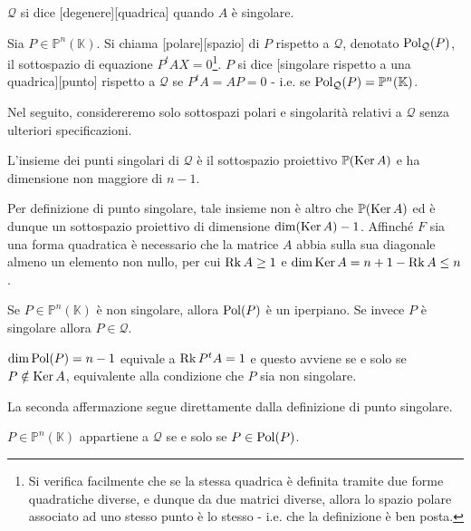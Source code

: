 \begin{Definition}\label{def50}
	$\mathcal{Q}$ si dice [degenere][quadrica] quando $A$ \`e singolare.
\end{Definition}
\begin{Definition}\label{def51}
	Sia $P \in \mathbb{P}^n(\mathbb{K})$. Si chiama [polare][spazio] di $P$ rispetto a $\mathcal{Q}$, denotato $\operatorname{Pol}_\mathcal{Q}(P)$, il sottospazio di equazione $P^tAX = 0$\footnote{Si verifica facilmente che se la stessa quadrica \`e definita tramite due forme quadratiche diverse, e dunque da due matrici diverse, allora lo spazio polare associato ad uno stesso punto \`e lo stesso - i.e. che la definizione \`e ben posta.}. $P$ si dice [singolare rispetto a una quadrica][punto] rispetto a $\mathcal{Q}$ se $P^tA = AP = 0$ - i.e. se $\operatorname{Pol}_\mathcal{Q}(P) = \mathbb{P}^n(\mathbb{K})$.
\end{Definition}
	\par Nel seguito, considereremo solo sottospazi polari e singolarit\`a relativi a $\mathcal{Q}$ senza ulteriori specificazioni.
\begin{Theorem}\label{th56bis}
	L'insieme dei punti singolari di $\mathcal{Q}$ \`e il sottospazio proiettivo $\mathbb{P}(\operatorname{Ker} A)$ e ha dimensione non maggiore di $n - 1$.
\end{Theorem}
\Proof Per definizione di punto singolare, tale insieme non \`e altro che $\mathbb{P}(\operatorname{Ker} A)$ ed \`e dunque un sottospazio proiettivo di dimensione $\dim (\operatorname{Ker} A) - 1$. Affinch\'e $F$ sia una forma quadratica \`e necessario che la matrice $A$ abbia sulla sua diagonale almeno un elemento non nullo, per cui $\operatorname{Rk} A \geq 1$ e $\dim \operatorname{Ker} A = n + 1 - \operatorname{Rk} A \leq n$. \EndProof
\begin{Theorem}\label{th57}
	Se $P \in \mathbb{P}^n(\mathbb{K})$ \`e non singolare, allora $\operatorname{Pol}(P)$ \`e un iperpiano. Se invece $P$ \`e singolare allora $P \in \mathcal{Q}$.
\end{Theorem}
\Proof $\dim \operatorname{Pol}(P) = n - 1$ equivale a $\operatorname{Rk} P^tA = 1$ e questo avviene se e solo se $P \notin \operatorname{Ker} A$, equivalente alla condizione che $P$ sia non singolare.
\par La seconda affermazione segue direttamente dalla definizione di punto singolare. \EndProof
\begin{Theorem}\label{th58}
	$P \in \mathbb{P}^n(\mathbb{K})$ appartiene a $\mathcal{Q}$ se e solo se $P \in \operatorname{Pol}(P)$.
\end{Theorem}
